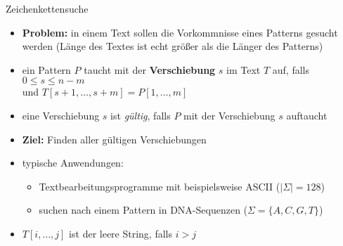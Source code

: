 \begin{TOP}{Zeichenkettensuche}
	\up\up\begin{itemize}[itemsep=-1pt]
		\item \textbf{Problem:} in einem Text sollen die Vorkommnisse eines Patterns gesucht werden (Länge des Textes ist echt größer als die Länger des Patterns)
		\item ein Pattern $P$ taucht mit der \textbf{Verschiebung} $s$ im Text $T$ auf, falls $0\leq s\leq n-m$\\
		und $T[s+1,\dots,s+m]= P[1,\dots,m]$
		\item eine Verschiebung $s$ ist \textit{gültig}, falls $P$ mit der Verschiebung $s$ auftaucht
		\item \textbf{Ziel:} Finden aller gültigen Verschiebungen
		\item typische Anwendungen:
			\begin{itemize}
				\item Textbearbeitungsprogramme mit beispielsweise ASCII ($|\Sigma|=128$)
				\item suchen nach einem Pattern in DNA-Sequenzen ($\Sigma=\{A,C,G,T\}$)
			\end{itemize}
		\item $T[i,\dots,j]$ ist der leere String, falls $i>j$
	\end{itemize}
\end{TOP}